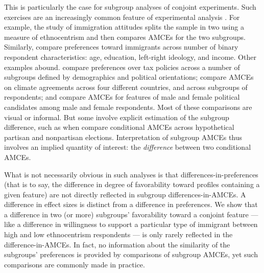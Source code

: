 \documentclass[a4paper,12pt]{article}\usepackage[]{graphicx}\usepackage[]{color}
\begin{document}
This is particularly the case for subgroup analyses of conjoint experiments. Such exercises are an increasingly common feature of experimental analysis \citep{GreenKern2012, RatkovicTingley2017, GrimmerMessingWestwood2017, EgamiImai2018}. For example, the \citet{HainmuellerHopkinsYamamoto2014} study of immigration attitudes splits the sample in two using a measure of ethnocentrism and then compares AMCEs for the two subgroups. Similarly, \citet{BansakHainmuellerHangartner2016} compare preferences toward immigrants across number of binary respondent characteristics: age, education, left-right ideology, and income. Other examples abound. \citet{BallardRosaMartinScheve2016} compare preferences over tax policies across a number of subgroups defined by demographics and political orientations; \citet{BechtelScheve2013} compare AMCEs on climate agreements across four different countries, and across subgroups of respondents; and \citet{TeeleKallaRosenbluth2018} compare AMCEs for features of male and female political candidates among male and female respondents. Most of these comparisons are visual or informal. But some involve explicit estimation of the subgroup difference, such as when \citet{KirklandCoppock2017} compare conditional AMCEs across hypothetical partisan and nonpartisan elections. Interpretation of subgroup AMCEs thus involves an implied quantity of interest: the \textit{difference} between two conditional AMCEs.

What is not necessarily obvious in such analyses is that differences-in-preferences (that is to say, the difference in degree of favorability toward profiles containing a given feature) are not directly reflected in subgroup differences-in-AMCEs. A difference in effect sizes is distinct from a difference in preferences. We show that a difference in two (or more) subgroups' favorability toward a conjoint feature --- like a difference in willingness to support a particular type of immigrant between high and low ethnocentrism respondents --- is only rarely reflected in the difference-in-AMCEs. In fact, no information about the similarity of the subgroups' preferences is provided by comparisons of subgroup AMCEs, yet such comparisons are commonly made in practice.
\end{document}
